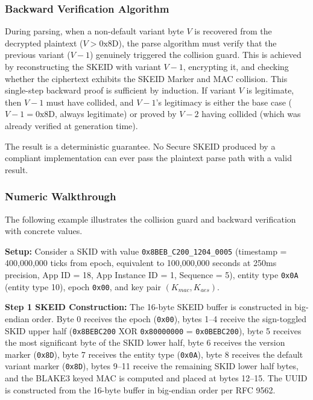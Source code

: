 \documentclass[fleqn,10pt]{wlpeerj}
\begin{document}
\subsubsection{Backward Verification
Algorithm}\label{backward-verification-algorithm}

During parsing, when a non-default variant byte \(V\) is recovered from
the decrypted plaintext (\(V > \text{0x8D}\)), the parse algorithm must
verify that the previous variant (\(V-1\)) genuinely triggered the
collision guard. This is achieved by reconstructing the SKEID with
variant \(V-1\), encrypting it, and checking whether the ciphertext
exhibits the SKEID Marker and MAC collision. This single-step backward
proof is sufficient by induction. If variant \(V\) is legitimate, then
\(V-1\) must have collided, and \(V-1\)'s legitimacy is either the base
case (\(V-1 = \text{0x8D}\), always legitimate) or proved by \(V-2\)
having collided (which was already verified at generation time).

The result is a deterministic guarantee. No Secure SKEID produced by a
compliant implementation can ever pass the plaintext parse path with a
valid result.

\newpage

\subsubsection{Numeric Walkthrough}\label{numeric-walkthrough}

The following example illustrates the collision guard and backward
verification with concrete values.

\textbf{Setup:} Consider a SKID with value
\texttt{0x8BEB\_C200\_1204\_0005} (timestamp = 400,000,000 ticks from
epoch, equivalent to 100,000,000 seconds at 250ms precision, App ID =
18, App Instance ID = 1, Sequence = 5), entity type \texttt{0x0A}
(entity type 10), epoch \texttt{0x00}, and key pair
\((K_{mac}, K_{aes})\).

\textbf{Step 1 SKEID Construction:} The 16-byte SKEID buffer is
constructed in big-endian order. Byte 0 receives the epoch
(\texttt{0x00}), bytes 1--4 receive the sign-toggled SKID upper half
(\texttt{0x8BEBC200} XOR \texttt{0x80000000} = \texttt{0x0BEBC200}),
byte 5 receives the most significant byte of the SKID lower half, byte 6
receives the version marker (\texttt{0x8D}), byte 7 receives the entity
type (\texttt{0x0A}), byte 8 receives the default variant marker
(\texttt{0x8D}), bytes 9--11 receive the remaining SKID lower half
bytes, and the BLAKE3 keyed MAC is computed and placed at bytes 12--15.
The UUID is constructed from the 16-byte buffer in big-endian order per
RFC 9562.
\end{document}
